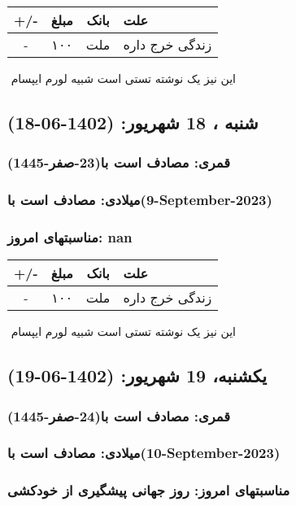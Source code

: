 \documentclass{article}
\newcommand{\rnote}[1]{\marginpar{\textcolor{color}{\StrSubstitute{\##1}{ }{\_}}}}
\newcommand{\myRow}[4]{
    #1 & #2 & #3 & #4 \\ \hline
}
\begin{document}
\begin{tabular}{ | c | c | c | p{5cm} |}
    \hline
    \myRow{ +/- }{مبلغ}{بانک}{علت}
    \myRow{-}{۱۰۰}{ملت}{زندگی خرج داره}
\end{tabular}
\newline
\newline

‌
\rnote{تست}
این نیز یک نوشته تستی است شبیه لورم ایپسام




\newpage
{}
\textcolor{color}{
\section{ شنبه ، 18 شهریور: (1402-06-18) }
\subsubsection*{قمری: مصادف است با(23-صفر-1445)} 
\subsubsection*{میلادی: مصادف است با(9-September-2023)}
\subsubsection*{مناسبتهای امروز: nan}
}


\begin{tabular}{ | c | c | c | p{5cm} |}
    \hline
    \myRow{ +/- }{مبلغ}{بانک}{علت}
    \myRow{-}{۱۰۰}{ملت}{زندگی خرج داره}
\end{tabular}
\newline
\newline

‌
\rnote{تست}
این نیز یک نوشته تستی است شبیه لورم ایپسام




\newpage
{}
\textcolor{color}{
\section{ یکشنبه، 19 شهریور: (1402-06-19) }
\subsubsection*{قمری: مصادف است با(24-صفر-1445)} 
\subsubsection*{میلادی: مصادف است با(10-September-2023)}
\subsubsection*{مناسبتهای امروز: روز جهانی پیشگیری از خودکشی}
}
\end{document}
